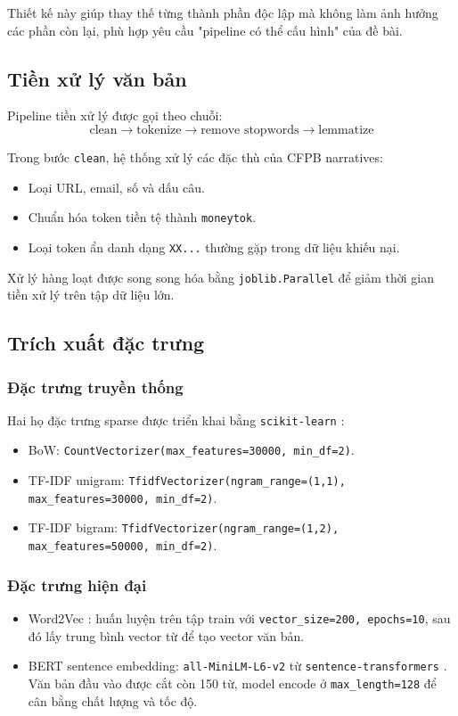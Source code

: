Thiết kế này giúp thay thế từng thành phần độc lập mà không làm ảnh hưởng các phần còn lại, phù hợp yêu cầu "pipeline có thể cấu hình" của đề bài.

\subsection{Tiền xử lý văn bản}
Pipeline tiền xử lý được gọi theo chuỗi:
\begin{equation}
\text{clean} \rightarrow \text{tokenize} \rightarrow \text{remove stopwords} \rightarrow \text{lemmatize}
\end{equation}

Trong bước \texttt{clean}, hệ thống xử lý các đặc thù của CFPB narratives:
\begin{itemize}[nosep]
    \item Loại URL, email, số và dấu câu.
    \item Chuẩn hóa token tiền tệ thành \texttt{moneytok}.
    \item Loại token ẩn danh dạng \texttt{XX...} thường gặp trong dữ liệu khiếu nại.
\end{itemize}

Xử lý hàng loạt được song song hóa bằng \texttt{joblib.Parallel} để giảm thời gian tiền xử lý trên tập dữ liệu lớn.

\subsection{Trích xuất đặc trưng}
\subsubsection{Đặc trưng truyền thống}
Hai họ đặc trưng sparse được triển khai bằng \texttt{scikit-learn} \cite{scikit-learn}:
\begin{itemize}[nosep]
    \item BoW: \texttt{CountVectorizer(max\_features=30000, min\_df=2)}.
    \item TF-IDF unigram: \texttt{TfidfVectorizer(ngram\_range=(1,1), max\_features=30000, min\_df=2)}.
    \item TF-IDF bigram: \texttt{TfidfVectorizer(ngram\_range=(1,2), max\_features=50000, min\_df=2)}.
\end{itemize}

\subsubsection{Đặc trưng hiện đại}
\begin{itemize}[nosep]
    \item Word2Vec \cite{mikolov2013efficient}: huấn luyện trên tập train với \texttt{vector\_size=200, epochs=10}, sau đó lấy trung bình vector từ để tạo vector văn bản.
    \item BERT sentence embedding: \texttt{all-MiniLM-L6-v2} từ \texttt{sentence-transformers} \cite{reimers2019sentencebert}. Văn bản đầu vào được cắt còn 150 từ, model encode ở \texttt{max\_length=128} để cân bằng chất lượng và tốc độ.
\end{itemize}

